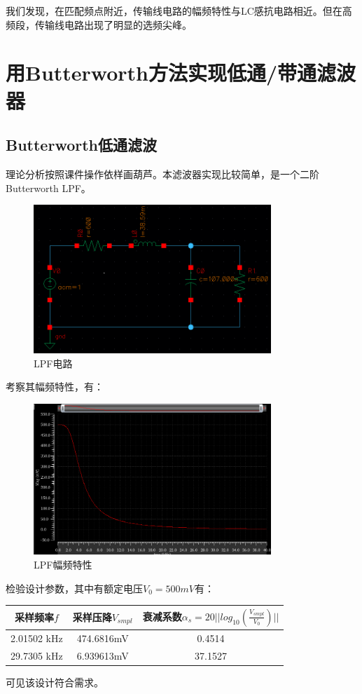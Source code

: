 \documentclass[12pt, a4paper]{article}
\begin{document}
   我们发现，在匹配频点附近，传输线电路的幅频特性与LC感抗电路相近。但在高频段，传输线电路出现了明显的选频尖峰。\par
   \section{用Butterworth方法实现低通/带通滤波器}
   \subsection{Butterworth低通滤波}
   理论分析按照课件操作依样画葫芦。本滤波器实现比较简单，是一个二阶Butterworth LPF。
   \begin{figure}[H]
   	    \centering
   	    \includegraphics[width = 0.8\textwidth]{ButterworthLPF-circuit}
   	    \caption{LPF电路}
   	    \label{Fig2.1}
   \end{figure}
    考察其幅频特性，有：
    \begin{figure}[H]
    	\centering
    	\includegraphics[width = 0.8\textwidth]{ButterworthLPF-plot}
    	\caption{LPF幅频特性}
    \end{figure}\par
   
   检验设计参数，其中有额定电压$V_0 = 500mV$有：\par
   \begin{center}
   	\begin{tabular}{| c | c | c | }
   		\hline
   		采样频率$f$ &  采样压降$V_{smpl}$ & 衰减系数$\alpha_s = 20 || log_{10}(\frac{V_{smpl}}{V_0}) ||$  \\
   		\hline
   		2.01502 kHz & 474.6816mV & 0.4514 \\
   		\hline
   		29.7305 kHz & 6.939613mV & 37.1527 \\
   		\hline
   	\end{tabular}
   \end{center} \par
    可见该设计符合需求。
\end{document}
